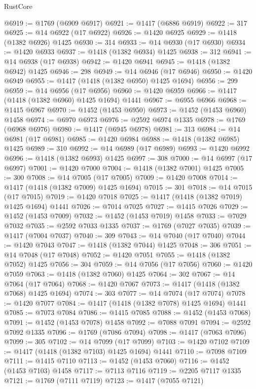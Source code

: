 \begin{lexlean}{RustCore}
\begin{coremodule}
@6919 := @1769 (@6909 @6917)
@6921 := @1417 (@6886 @6919)
@6922 := 317
@6925 := @14 @6922 (@17 @6922)
@6926 := @1420 @6925
@6929 := @1418 (@1382 @6926) @1425
@6930 := 314
@6933 := @14 @6930 (@17 @6930)
@6934 := @1420 @6933
@6937 := @1418 (@1382 @6934) @1425
@6938 := 312
@6941 := @14 @6938 (@17 @6938)
@6942 := @1420 @6941
@6945 := @1418 (@1382 @6942) @1425
@6946 := 298
@6949 := @14 @6946 (@17 @6946)
@6950 := @1420 @6949
@6955 := @1417 (@1418 (@1382 @6950) @1425 @1694)
@6956 := 299
@6959 := @14 @6956 (@17 @6956)
@6960 := @1420 @6959
@6966 := @1417 (@1418 (@1382 @6960) @1425 @1694) @1441
@6967 := @6955 @6966
@6968 := @1415 @6967
@6970 := @1452 (@1453 @6950)
@6973 := @1452 (@1453 @6960) @1458
@6974 := @6970 @6973
@6976 := @2592 @6974 @1335
@6978 := @1769 (@6968 @6976)
@6980 := @1417 (@6945 @6978)
@6981 := 313
@6984 := @14 @6981 (@17 @6981)
@6985 := @1420 @6984
@6988 := @1418 (@1382 @6985) @1425
@6989 := 310
@6992 := @14 @6989 (@17 @6989)
@6993 := @1420 @6992
@6996 := @1418 (@1382 @6993) @1425
@6997 := 308
@7000 := @14 @6997 (@17 @6997)
@7001 := @1420 @7000
@7004 := @1418 (@1382 @7001) @1425
@7005 := 300
@7008 := @14 @7005 (@17 @7005)
@7009 := @1420 @7008
@7014 := @1417 (@1418 (@1382 @7009) @1425 @1694)
@7015 := 301
@7018 := @14 @7015 (@17 @7015)
@7019 := @1420 @7018
@7025 := @1417 (@1418 (@1382 @7019) @1425 @1694) @1441
@7026 := @7014 @7025
@7027 := @1415 @7026
@7029 := @1452 (@1453 @7009)
@7032 := @1452 (@1453 @7019) @1458
@7033 := @7029 @7032
@7035 := @2592 @7033 @1335
@7037 := @1769 (@7027 @7035)
@7039 := @1417 (@7004 @7037)
@7040 := 309
@7043 := @14 @7040 (@17 @7040)
@7044 := @1420 @7043
@7047 := @1418 (@1382 @7044) @1425
@7048 := 306
@7051 := @14 @7048 (@17 @7048)
@7052 := @1420 @7051
@7055 := @1418 (@1382 @7052) @1425
@7056 := 304
@7059 := @14 @7056 (@17 @7056)
@7060 := @1420 @7059
@7063 := @1418 (@1382 @7060) @1425
@7064 := 302
@7067 := @14 @7064 (@17 @7064)
@7068 := @1420 @7067
@7073 := @1417 (@1418 (@1382 @7068) @1425 @1694)
@7074 := 303
@7077 := @14 @7074 (@17 @7074)
@7078 := @1420 @7077
@7084 := @1417 (@1418 (@1382 @7078) @1425 @1694) @1441
@7085 := @7073 @7084
@7086 := @1415 @7085
@7088 := @1452 (@1453 @7068)
@7091 := @1452 (@1453 @7078) @1458
@7092 := @7088 @7091
@7094 := @2592 @7092 @1335
@7096 := @1769 (@7086 @7094)
@7098 := @1417 (@7063 @7096)
@7099 := 305
@7102 := @14 @7099 (@17 @7099)
@7103 := @1420 @7102
@7109 := @1417 (@1418 (@1382 @7103) @1425 @1694) @1441
@7110 := @7098 @7109
@7111 := @1415 @7110
@7113 := @1452 (@1453 @7060)
@7116 := @1452 (@1453 @7103) @1458
@7117 := @7113 @7116
@7119 := @2205 @7117 @1335
@7121 := @1769 (@7111 @7119)
@7123 := @1417 (@7055 @7121)

\end{coremodule}
\end{lexlean}
